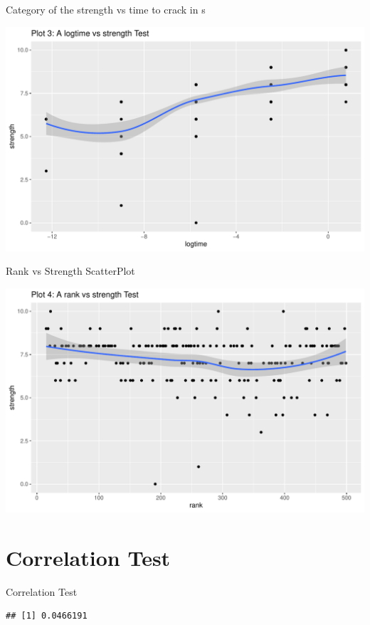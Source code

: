 \documentclass[10pt,ignorenonframetext,aspectratio=169]{beamer}
\newenvironment{Shaded}{\begin{snugshade}}{\end{snugshade}}
\newcommand{\AttributeTok}[1]{\textcolor[rgb]{0.77,0.63,0.00}{#1}}
\newcommand{\FunctionTok}[1]{\textcolor[rgb]{0.00,0.00,0.00}{#1}}
\newcommand{\NormalTok}[1]{#1}
\newcommand{\OtherTok}[1]{\textcolor[rgb]{0.56,0.35,0.01}{#1}}
\newcommand{\SpecialCharTok}[1]{\textcolor[rgb]{0.00,0.00,0.00}{#1}}
\renewenvironment{Shaded}{\color{black}\begin{snugshade}\color{black}}{\end{snugshade}}
\begin{document}
\begin{frame}{Category of the strength vs time to crack in s}
\protect\hypertarget{category-of-the-strength-vs-time-to-crack-in-s}{}
\begin{center}\includegraphics[width=0.8\linewidth]{Untitled_files/figure-beamer/plot2a-1} \end{center}
\end{frame}

\begin{frame}{Rank vs Strength ScatterPlot}
\protect\hypertarget{rank-vs-strength-scatterplot}{}
\begin{center}\includegraphics[width=0.8\linewidth]{Untitled_files/figure-beamer/plot3d-1} \end{center}
\end{frame}

\hypertarget{correlation-test}{%
\section{Correlation Test}\label{correlation-test}}

\begin{frame}[fragile]{Correlation Test}
\begin{Shaded}
\end{Shaded}

\begin{verbatim}
## [1] 0.0466191
\end{verbatim}
\end{frame}
\end{document}
